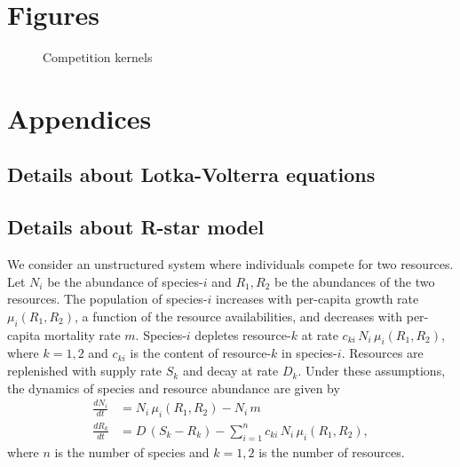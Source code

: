 \documentclass[a4paper,11pt]{article}
\begin{document}
\section{Figures}

\begin{figure}[h]
  \centering
  \caption{Competition kernels}
  \label{fig:competition-kernels}
\end{figure}

\clearpage




\section{Appendices}

\subsection{Details about Lotka-Volterra equations}\label{LV}

\subsection{Details about R-star model}\label{Rstar}

We consider an unstructured system where individuals compete for two
resources. Let $N_i$ be the abundance of species-$i$ and $R_1, R_2$ be the
abundances of the two resources. The population of species-$i$ increases with
per-capita
growth rate $\mu_i(R_1,R_2)$, a function of the resource availabilities, and
decreases with per-capita mortality rate $m$. Species-$i$ depletes resource-$k$
at rate $c_{ki} \,  N_i \, \mu_i(R_1,R_2)$, where $k = 1, 2$ and $c_{ki}$ is
the content of resource-$k$ in species-$i$. Resources
are replenished
with supply rate $S_k$ and decay at rate $D_k$. Under these assumptions, the
dynamics of species and resource abundance are given by
\begin{subequations}
  \begin{align}
\label{eq:R1}
\frac{dN_i}{dt} &= N_i \, \mu_i(R_1,R_2) - N_i \, m \\
\frac{dR_k}{dt} &= D \, (S_k- R_k) - \sum_{i=1}^{n}{c_{ki} \, N_i \,
  \mu_i(R_1, R_2)},
\end{align}
\end{subequations}
where $n$ is the number of species and $k=1,2$ is the number of resources.
\end{document}
